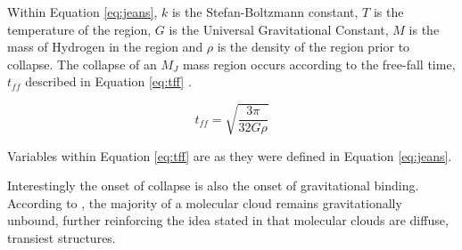 \documentclass{report}
\begin{document}
Within Equation \ref{eq:jeans}, $k$ is the Stefan-Boltzmann constant, $T$ is the temperature of the region, $G$ is the Universal Gravitational Constant, $M$ is the mass of Hydrogen in the region and $\rho$ is the density of the region prior to collapse. The collapse of an $M_{J}$ mass region occurs according to the free-fall time, $t_{ff}$ described in Equation \ref{eq:tff} \parencite{krumholz}.

\begin{equation}\label{eq:tff}
  t_{ff} = \sqrt{\frac{3\pi}{32G\rho}}
\end{equation}

Variables within Equation \ref{eq:tff} are as they were defined in Equation \ref{eq:jeans}.

Interestingly the onset of collapse is also the onset of gravitational binding. According to \textcite{bound}, the majority of a molecular cloud remains gravitationally unbound, further reinforcing the idea stated in \textcite{evo-mol} that molecular clouds are diffuse, transiest structures.
\end{document}

